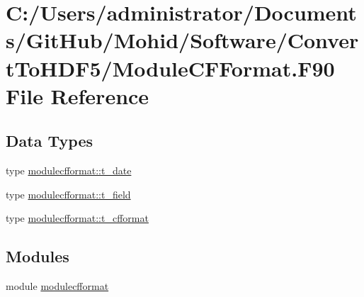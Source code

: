 \hypertarget{_module_c_f_format_8_f90}{}\section{C\+:/\+Users/administrator/\+Documents/\+Git\+Hub/\+Mohid/\+Software/\+Convert\+To\+H\+D\+F5/\+Module\+C\+F\+Format.F90 File Reference}
\label{_module_c_f_format_8_f90}
\subsection*{Data Types}
\begin{DoxyCompactItemize}
\item 
type \mbox{\hyperlink{structmodulecfformat_1_1t__date}{modulecfformat\+::t\+\_\+date}}
\item 
type \mbox{\hyperlink{structmodulecfformat_1_1t__field}{modulecfformat\+::t\+\_\+field}}
\item 
type \mbox{\hyperlink{structmodulecfformat_1_1t__cfformat}{modulecfformat\+::t\+\_\+cfformat}}
\end{DoxyCompactItemize}
\subsection*{Modules}
\begin{DoxyCompactItemize}
\item 
module \mbox{\hyperlink{namespacemodulecfformat}{modulecfformat}}
\end{DoxyCompactItemize}
